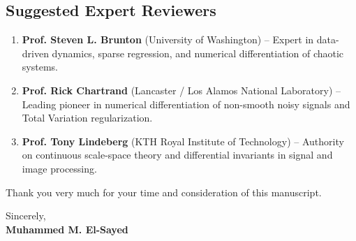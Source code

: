 \documentclass[11pt,a4paper]{article}
\begin{document}
\subsection*{Suggested Expert Reviewers}
\begin{enumerate}
    \item \textbf{Prof. Steven L. Brunton} (University of Washington) -- Expert in data-driven dynamics, sparse regression, and numerical differentiation of chaotic systems.
    \item \textbf{Prof. Rick Chartrand} (Lancaster / Los Alamos National Laboratory) -- Leading pioneer in numerical differentiation of non-smooth noisy signals and Total Variation regularization.
    \item \textbf{Prof. Tony Lindeberg} (KTH Royal Institute of Technology) -- Authority on continuous scale-space theory and differential invariants in signal and image processing.
\end{enumerate}

Thank you very much for your time and consideration of this manuscript.

\vspace{2em}

\noindent
Sincerely,\\
\textbf{Muhammed M. El-Sayed}
\end{document}
